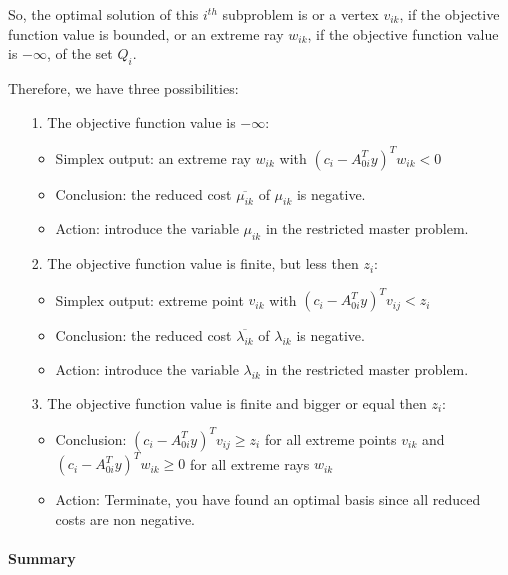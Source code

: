 \documentclass[a4paper,12pt]{article}
\begin{document}
So, the optimal solution of this $i^{th}$ subproblem is or a vertex $v_{ik}$, if the objective function value is bounded, or an extreme ray $w_{ik}$, if the objective function value    is $-\infty$, of the set $Q_i$.  



Therefore, we have three possibilities:
\begin{itemize}
\item[1.] The objective function value is $-\infty$:
\begin{itemize}
\item Simplex output: an extreme ray $w_{ik}$  with $ (c_i - A_{0i}^Ty)^Tw_{ik}  < 0$
\item Conclusion: the reduced cost $\overline{\mu_{ik}}$ of $\mu_{ik}$ is negative.
\item Action: introduce the variable $\mu_{ik}$ in the restricted master problem.
\end{itemize}
\item[2.] The objective function value is finite, but less then $z_i$:
\begin{itemize}
\item Simplex output: extreme point $v_{ik}$ with $ (c_i - A_{0i}^Ty)^Tv_{ij} < z_i $
\item Conclusion: the reduced cost $\overline{\lambda_{ik}}$ of $\lambda_{ik}$ is negative.
\item Action: introduce the variable $\lambda_{ik}$ in the restricted master problem.
\end{itemize}
\item[3.] The objective function value is finite and bigger or equal then $z_i$:
\begin{itemize}
\item Conclusion: $ (c_i - A_{0i}^Ty)^Tv_{ij} \geq z_i $ for all extreme points $v_{ik}$ and $ (c_i - A_{0i}^Ty)^Tw_{ik}  \geq 0$ for all extreme rays $w_{ik}$
\item Action: Terminate, you have found an optimal basis since all reduced costs are non negative.
\end{itemize}
\end{itemize}

\paragraph*{Summary}
\end{document}
